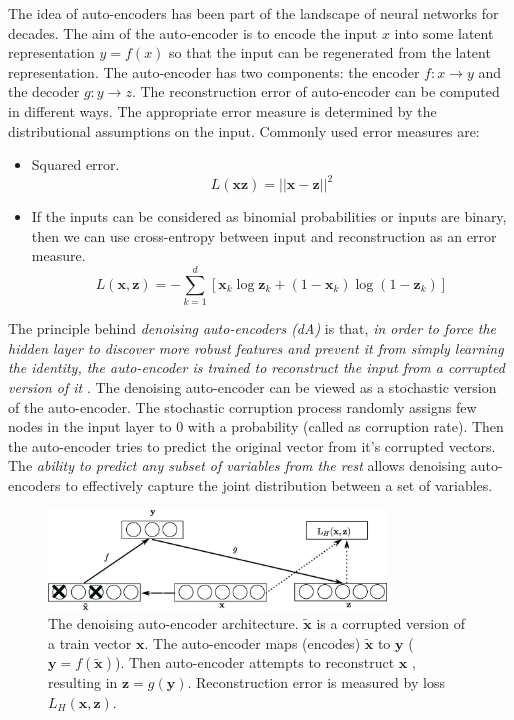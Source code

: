 The idea of auto-encoders has been part of the landscape of neural networks for decades.  The aim of the auto-encoder is to encode the input $x$ into some latent representation $y = f(x)$ so that the input can be regenerated from the latent representation.  The auto-encoder has two components: the encoder $f:x \rightarrow y$ and the decoder $g:y \rightarrow z$.  The reconstruction error of auto-encoder can be computed in different ways.  The appropriate error measure is determined by the distributional assumptions on the input.  Commonly used error measures are:
\begin{itemize}
\item Squared error.
$$ L(\mathbf{x} \mathbf{z}) = || \mathbf{x} - \mathbf{z} ||^2$$
\item If the inputs can be considered as binomial probabilities or inputs are binary, then we can use cross-entropy between input and reconstruction as an error measure.
$$L(\mathbf{x}, \mathbf{z}) = - \sum^d_{k=1}[\mathbf{x}_k \log \mathbf{z}_k + (1 - \mathbf{x}_k)\log(1 - \mathbf{z}_k)]$$
\end{itemize}

The principle behind \emph{denoising auto-encoders (dA)} is that, \textit{in order to force the hidden layer to discover more robust features and prevent it from simply learning the identity, the auto-encoder is trained to reconstruct the input from a corrupted version of it} \cite{vincent2008extracting}.  The denoising auto-encoder can be viewed as a stochastic version of the auto-encoder.  The stochastic corruption process randomly assigns few nodes in the input layer to $0$ with a probability (called as corruption rate).  Then the auto-encoder tries to predict the original vector from it's corrupted vectors.  The \textit{ability to predict any subset of variables from the rest} allows denoising auto-encoders to effectively capture the joint distribution between a set of variables.

\begin{figure}[ht]
\centering
\includegraphics[width=0.8\textwidth]{./imgs/sda.eps}
\caption[The denoising auto-encoder architecture]{The denoising auto-encoder architecture. $\mathbf{\tilde{x}}$ is a corrupted version of a train vector $\mathbf{x}$.  The auto-encoder maps (encodes) $\mathbf{\tilde{x}}$ to $\mathbf{y}$ ($\mathbf{y} = f(\mathbf{\tilde{x}})$).  Then auto-encoder attempts to reconstruct $\mathbf{x}$ , resulting in $ \mathbf{z} = g(\mathbf{y}) $. Reconstruction error is measured by loss $L_{H}(\mathbf{x},\mathbf{z})$. }
\label{fig:sdaChain}
\end{figure}

